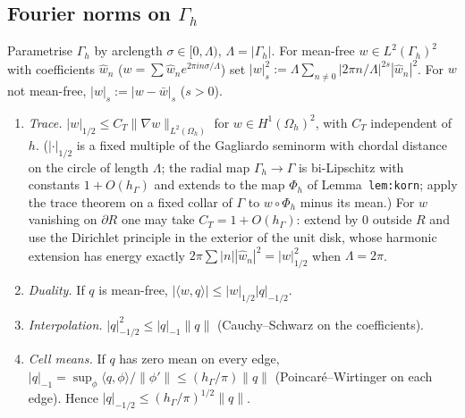 \documentclass[11pt]{article}
\theoremstyle{remark}
\newcommand{\hG}{h_\Gamma}
\newcommand{\Gh}{\Gamma_h}
\newcommand{\Oh}{\Omega_h}
\newcommand{\norm}[1]{\|#1\|}
\newcommand{\ip}[2]{\langle #1,#2\rangle}
\begin{document}
\subsection*{Fourier norms on $\Gh$}
Parametrise $\Gh$ by arclength $\sigma\in[0,\Lambda)$, $\Lambda=|\Gh|$. For mean-free $w\in L^2(\Gh)^2$ with coefficients $\hat w_n$ ($w=\sum\hat w_ne^{2\pi in\sigma/\Lambda}$) set $|w|_s^2:=\Lambda\sum_{n\ne0}|2\pi n/\Lambda|^{2s}|\hat w_n|^2$. For $w$ not mean-free, $|w|_s:=|w-\bar w|_s$ ($s>0$).
\begin{enumerate}[label=(F\arabic*)]
\item \emph{Trace.} $|w|_{1/2}\le C_T\norm{\nabla w}_{L^2(\Oh)}$ for $w\in H^1(\Oh)^2$, with $C_T$ independent of $h$. ($|\cdot|_{1/2}$ is a fixed multiple of the Gagliardo seminorm with chordal distance on the circle of length $\Lambda$; the radial map $\Gh\to\Gamma$ is bi-Lipschitz with constants $1+O(\hG)$ and extends to the map $\Phi_h$ of Lemma~\texttt{lem:korn}; apply the trace theorem on a fixed collar of $\Gamma$ to $w\circ\Phi_h$ minus its mean.) For $w$ vanishing on $\partial R$ one may take $C_T=1+O(\hG)$: extend by $0$ outside $R$ and use the Dirichlet principle in the exterior of the unit disk, whose harmonic extension has energy exactly $2\pi\sum|n||\hat w_n|^2=|w|_{1/2}^2$ when $\Lambda=2\pi$.
\item \emph{Duality.} If $q$ is mean-free, $|\ip wq|\le|w|_{1/2}|q|_{-1/2}$.
\item \emph{Interpolation.} $|q|_{-1/2}^2\le|q|_{-1}\norm q$ (Cauchy--Schwarz on the coefficients).
\item \emph{Cell means.} If $q$ has zero mean on every edge, $|q|_{-1}=\sup_\phi\ip q\phi/\norm{\phi'}\le(\hG/\pi)\norm q$ (Poincar\'e--Wirtinger on each edge). Hence $|q|_{-1/2}\le(\hG/\pi)^{1/2}\norm q$.
\end{enumerate}
\end{document}
